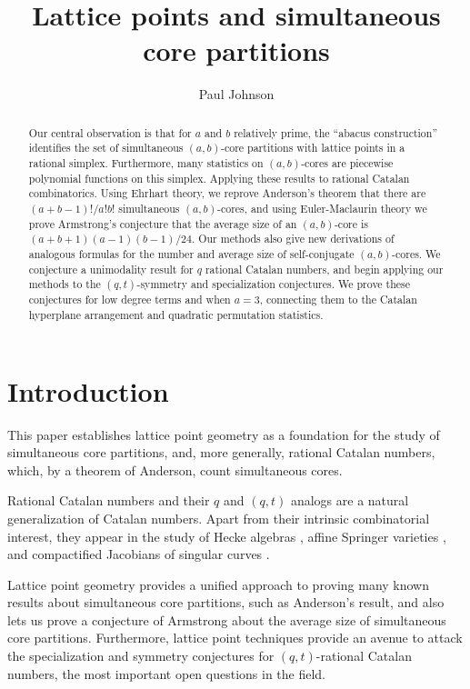 \documentclass{amsart}[12pt]
\theoremstyle{definition}
\begin{document}
\title{Lattice points and simultaneous core partitions}
\begin{abstract}
Our central observation is that for $a$ and $b$ relatively prime, the ``abacus construction'' identifies the set of simultaneous $(a,b)$-core partitions with lattice points in a rational simplex. Furthermore, many statistics on $(a,b)$-cores are piecewise polynomial functions on this simplex.
Applying these results to rational Catalan combinatorics. Using Ehrhart theory, we reprove Anderson's theorem \cite{anderson} that there are $(a+b-1)!/a!b!$ simultaneous $(a,b)$-cores, and using Euler-Maclaurin theory we prove Armstrong's conjecture \cite{AHJ} that the average size of an $(a,b)$-core is $(a+b+1)(a-1)(b-1)/24$. Our methods also give new derivations of analogous formulas for the number and average size of self-conjugate $(a,b)$-cores.
We conjecture a unimodality result for $q$ rational Catalan numbers, and begin applying our methods to the $(q,t)$-symmetry and specialization conjectures. We prove these conjectures for low degree terms and when $a=3$, connecting them to the Catalan hyperplane arrangement and quadratic permutation statistics.
\end{abstract}
\author{Paul Johnson}
\address{University of Sheffield}

\maketitle
\section{Introduction}
This paper establishes lattice point geometry as a foundation for the study of simultaneous core partitions, and, more generally, rational Catalan numbers, which, by a theorem of Anderson, count simultaneous cores.

Rational Catalan numbers and their $q$ and $(q,t)$ analogs are a natural generalization of Catalan numbers.  Apart from their intrinsic combinatorial interest, they appear in the study of Hecke algebras \cite{GG}, affine Springer varieties \cite{LS}, and compactified Jacobians of singular curves \cite{EM1, EM2}.   

Lattice point geometry provides a unified approach to proving many known results about simultaneous core partitions, such as Anderson's result, and also lets us prove a conjecture of Armstrong about the average size of simultaneous core partitions.  Furthermore, lattice point techniques provide an avenue to attack the specialization and symmetry conjectures for $(q,t)$-rational Catalan numbers, the most important open questions in the field.  
\end{document}
